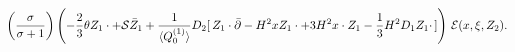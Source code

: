 \begin{equation}
\left(\frac{\sigma}{\sigma+1}\right)\left(-\frac{2}{3}\theta
Z_1\cdot+{\cal S} \bar Z_1+\frac{1}{\langle Q_{0}^{(1)}
\rangle}D_2[\,Z_1\cdot\bar\partial-H^2xZ_1\cdot+3H^2 x\cdot Z_1
-\frac{1}{3}H^2 D_1 Z_1\cdot\, ]\right) \,{\cal E}(x,\xi,Z_2).
\label{eq:pro}
\end{equation}

